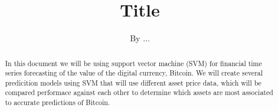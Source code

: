 \documentclass[a4paper]{article}
\title{Title}
\author{By ...}
\date{}
\begin{document}
\maketitle


\begin{abstract}
    In this document we will be using support vector machine (SVM) for financial time series forecasting of the value of the digital currency, Bitcoin. We will create several predicition models using SVM that will use different asset price data, which will be compared performace against each other to determine which assets are most associated to accurate predictions of Bitcoin.  

\end{abstract}




\small


\end{document}
